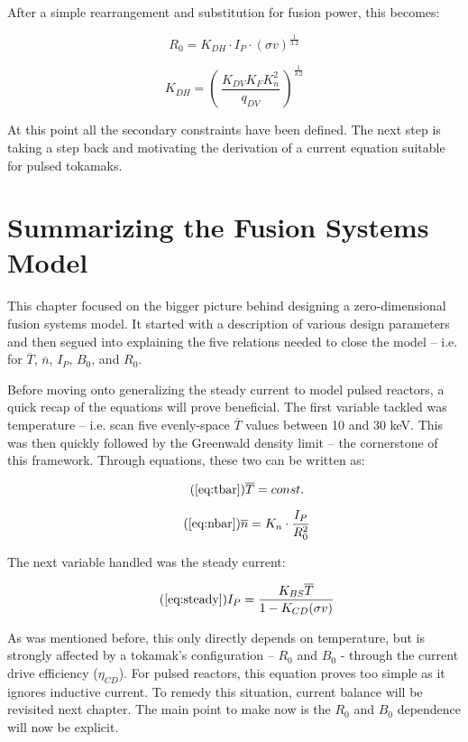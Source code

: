 After a simple rearrangement and substitution for fusion power, this becomes:

\begin{equation}
	R_0 = K_{DH} \cdot I_P \cdot (\sigma v)^ {\frac{1}{3.2}} 
\end{equation}

\begin{equation}
	K_{DH} = \left( \, \frac{ K_{DV} K_F K_n^2 }{ q_{DV} } \, \right) ^ {\frac{1}{3.2}}
\end{equation}

At this point all the secondary constraints have been defined. The next step is taking a step back and motivating the derivation of a current equation suitable for pulsed tokamaks.

\section{Summarizing the Fusion Systems Model}

This chapter focused on the bigger picture behind designing a zero-dimensional fusion systems model. It started with a description of various design parameters and then segued into explaining the five relations needed to close the model -- i.e. for $\overline T$, $\overline n$, $I_P$, $B_0$, and $R_0$.

Before moving onto generalizing the steady current to model pulsed reactors, a quick recap of the equations will prove beneficial. The first variable tackled was temperature -- i.e. scan five evenly-space $\overline T$ values between 10 and 30 keV. This was then quickly followed by the Greenwald density limit -- the cornerstone of this framework. Through equations, these two can be written as:

\begin{equation}
	\tag{\ref{eq:tbar}}
	\overline T = const.
\end{equation}

\begin{equation}
	\tag{\ref{eq:nbar}}
	\overline n = K_n \cdot \frac{I_P}{R_0^2}
\end{equation}

The next variable handled was the steady current:

\begin{equation}
	\tag{\ref{eq:steady}}
	I_P = \frac{K_{BS} \overline T}{1 - K_{CD} ( \sigma v ) }
\end{equation}

As was mentioned before, this only directly depends on temperature, but is strongly affected by a tokamak's configuration -- $R_0$ and $B_0$ - through the current drive efficiency ($\eta_{CD}$). For pulsed reactors, this equation proves too simple as it ignores inductive current. To remedy this situation, current balance will be revisited next chapter. The main point to make now is the $R_0$ and $B_0$ dependence will now be explicit.

